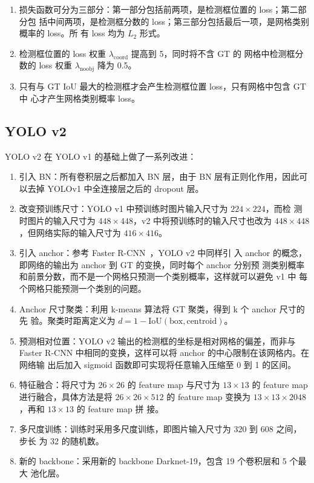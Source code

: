 \begin{enumerate}
  \item 损失函数可分为三部分：第一部分包括前两项，是检测框位置的 loss；第二部分包
    括中间两项，是检测框分数的 loss；第三部分包括最后一项，是网格类别概率的 loss。所
    有 loss 均为 $L_2$ 形式。
  \item 检测框位置的 loss 权重 $\lambda_{\mathrm{coord}}$ 提高到 5，同时将不含 GT 的
    网格中检测框分数的 loss 权重 $\lambda_{\mathrm{noobj}}$ 降为 0.5。
  \item 只有与 GT IoU 最大的检测框才会产生检测框位置 loss，只有网格中包含 GT 中
    心才产生网格类别概率 loss。
\end{enumerate}

\subsection{YOLO v2}\label{subsec:YOLOv2}
YOLO v2 在 YOLO v1 的基础上做了一系列改进：

\begin{enumerate}
  \item 引入 BN：所有卷积层之后都加入 BN 层，由于 BN 层有正则化作用，因此可以去掉
    YOLOv1 中全连接层之后的 dropout 层。
  \item 改变预训练尺寸：YOLO v1 中预训练时图片输入尺寸为 $224 \times 224$，而检
    测时图片的输入尺寸为 $448 \times 448$，v2 中将预训练时的输入尺寸也改为 $448
    \times 448$，但网络实际的输入尺寸为 $416 \times 416$。
  \item 引入 anchor：参考 Faster R-CNN~\cite{2015-Faster-RCNN}，YOLO v2 中同样引
    入 anchor 的概念，即网络的输出为 anchor 到 GT 的变换，同时每个 anchor 分别预
    测类别概率和前景分数，而不是一个网格只预测一个类别概率，这样就可以避免 v1 中
    每个网格只能预测一个类别的问题。
  \item Anchor 尺寸聚类：利用 k-means 算法将 GT 聚类，得到 k 个 anchor 尺寸的先
    验。聚类时距离定义为 $d = 1 - \mathrm{IoU}(\mathrm{box}, \mathrm{centroid})$。
  \item 预测相对位置：YOLO v2 输出的检测框的坐标是相对网格的偏差，而非与
    Faster R-CNN 中相同的变换，这样可以将 anchor 的中心限制在该网格内。在网络输
    出后加入 sigmoid 函数即可实现将任意输入压缩至 0 到 1 的区间。
  \item 特征融合：将尺寸为 $26 \times 26$ 的 feature map 与尺寸为 $13 \times 13$
    的 feature map 进行融合，具体方法是将 $26 \times 26 \times 512$ 的 feature
    map 变换为 $13 \times 13 \times 2048$，再和 $13 \times 13$ 的 feature map 拼
    接。
  \item 多尺度训练：训练时采用多尺度训练，即图片输入尺寸为 320 到 608 之间，步长
    为 32 的随机数。
  \item 新的 backbone：采用新的 backbone Darknet-19，包含 19 个卷积层和 5 个最大
    池化层。
\end{enumerate}

